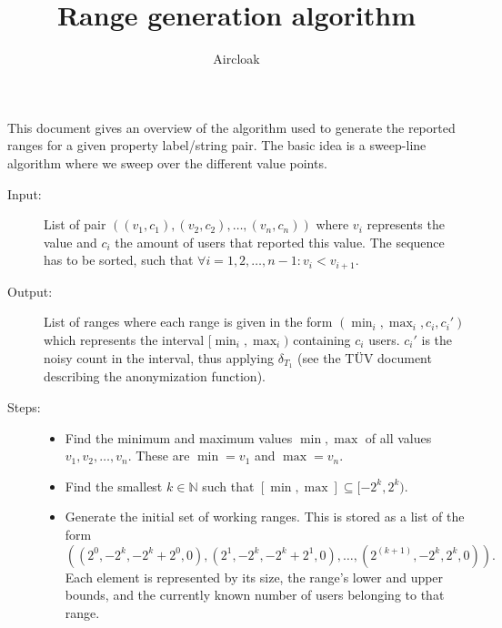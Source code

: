 \documentclass[english,a4paper]{article}
\begin{document}
  \title{Range generation algorithm}
  \author{Aircloak}
  \maketitle

  This document gives an overview of the algorithm used to generate the reported ranges for a given property
  label/string pair.
  The basic idea is a sweep-line algorithm where we sweep over the different value points.
  
  \begin{description}
    \item[Input:] List of pair $((v_1,c_1),(v_2,c_2),\ldots,(v_n,c_n))$ where $v_i$ represents the value and
    $c_i$ the amount of users that reported this value.  The sequence has to be sorted, such that $\forall
    i=1,2,\ldots,n-1:v_i<v_{i+1}$.

    \item[Output:] List of ranges where each range is given in the form $(\min_i,\max_i,c_i,c_i')$ which
    represents the interval $[\min_i,\max_i)$ containing $c_i$ users.  $c_i'$ is the noisy count in the
    interval, thus applying $\delta_{T_1}$ (see the TÜV document describing the anonymization function).

    \item[Steps:] \mbox{}
    \begin{itemize}
      \item Find the minimum and maximum values $\min,\max$ of all values $v_1,v_2,\ldots,v_n$.  These are
      $\min=v_1$ and $\max=v_n$.

      \item Find the smallest $k\in\mathds{N}$ such that $[\min,\max]\subseteq[-2^k,2^k)$.

      \item Generate the initial set of working ranges.  This is stored as a list of the form
        $$((2^0, -2^k, -2^k+2^0, 0), (2^1, -2^k, -2^k+2^1, 0), \ldots, (2^(k+1), -2^k, 2^k, 0)).$$
        Each element is represented by its size, the range's lower and upper bounds, and the currently known
        number of users belonging to that range.


\end{itemize}
\end{description}
\end{document}
